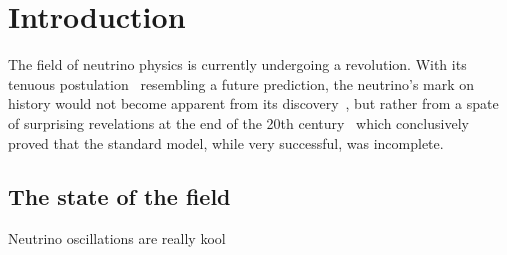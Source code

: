 \chapter{Introduction}
\label{chap:Introduction}


The field of neutrino physics is currently undergoing a revolution.  With its tenuous postulation~\cite{PauliOpenLetter} resembling a future prediction, the neutrino's mark on history would not become apparent from its discovery~\cite{Cowan20071956, PhysRevLett.9.36, Kodama2001218}, but rather from a spate of surprising revelations at the end of the 20th century~\cite{PhysRevLett.81.1562, PhysRevLett.87.071301, PhysRevLett.90.021802} which conclusively proved that the standard model, while very successful, was incomplete. 

\section{The state of the field}
\label{sec:StateOfTheField}
Neutrino oscillations are really kool
